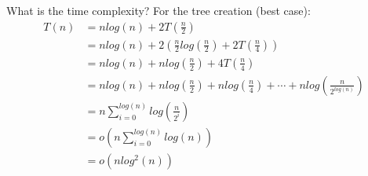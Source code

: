 \documentclass[11 pt]{beamer}
\begin{document}
\begin{frame}{What is the time complexity?}
  For the tree creation (best case):
  \begin{align*}
    T(n) &= nlog(n)+2T\left(\frac{n}{2}\right)\\
         &= nlog(n)+2\left(\frac{n}{2}log\left(\frac{n}{2}\right)+2T\left(\frac{n}{4}\right)\right)\\
         &= nlog(n)+nlog\left(\frac{n}{2}\right)+4T\left(\frac{n}{4}\right)\\
         &= nlog(n)+nlog\left(\frac{n}{2}\right)+nlog\left(\frac{n}{4}\right)+\cdots+nlog\left(\frac{n}{2^{log(n)}}\right)\\
         &= n\sum^{log(n)}_{i=0}log\left(\frac{n}{2^i}\right)\\
         &= o\left(n\sum^{log(n)}_{i=0}log(n)\right)\\
         &= o(nlog^2(n))
  \end{align*}
\end{frame}
\end{document}
